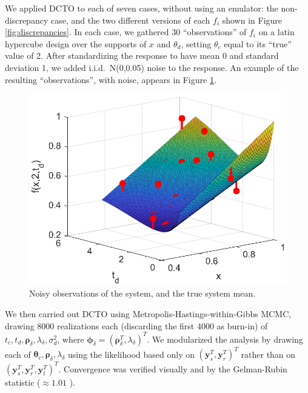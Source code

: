 \documentclass[12pt]{article}
\begin{document}
%
We applied DCTO to each of seven cases, without using an emulator: the non-discrepancy case, and the two different versions of each $f_i$ shown in Figure \ref{fig:discrepancies}.
%
In each case, we gathered 30 ``observations'' of $f_i$ on a latin hypercube design over the supports of $x$ and $\theta_d$, setting $\theta_c$ equal to its ``true'' value of 2.
%
After standardizing the response to have mean 0 and standard deviation 1, we added i.i.d.\ N(0,0.05) noise to the response.
%
An example of the resulting ``observations'', with noise, appears in Figure \ref{fig:observed_data}.
%
\begin{figure}
	\centering
	\includegraphics[scale=0.85]{FIG_observed_data}
	\captionsetup{width=.85\linewidth}
	\caption{Noisy observations of the system, and the true system mean.}
	\label{fig:observed_data}
\end{figure}
%
We then carried out DCTO using Metropolis-Hastings-within-Gibbs MCMC, drawing 8000 realizations each (discarding the first 4000 as burn-in) of $t_c,t_d,\boldsymbol\rho_{\delta},\lambda_{\delta},\sigma^2_d$, where $\boldsymbol\phi_\delta = (\boldsymbol\rho_\delta^T,\lambda_\delta)^T$.
%
We modularized the analysis by drawing each of $\boldsymbol\theta_c,\boldsymbol\rho_\delta,\lambda_\delta$ using the likelihood based only on $(\mathbf y_s^T,\mathbf y_r^T)^T$ rather than on $(\mathbf y_s^T,\mathbf y_r^T,\mathbf y_t^T)^T$.
%
Convergence was verified visually and by the Gelman-Rubin statistic ($\approx 1.01$ \cite{Gelfand1992}).
%
\end{document}
